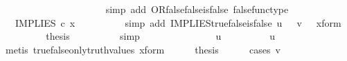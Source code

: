 \begin{isabellebody}
\ \ \ \ \ \ \isamarkupfalse%
\ \isamarkupfalse%
\ {\isachardoublequoteopen}{\isachardot}{\kern0pt}{\isachardot}{\kern0pt}{\isachardot}{\kern0pt}\ {\isacharequal}{\kern0pt}\ {\isasymf}{\isachardoublequoteclose}\isanewline
\ \ \ \ \ \ \ \ \isamarkupfalse%
\ {\isacharparenleft}{\kern0pt}simp\ add{\isacharcolon}{\kern0pt}\ OR{\isacharunderscore}{\kern0pt}false{\isacharunderscore}{\kern0pt}false{\isacharunderscore}{\kern0pt}is{\isacharunderscore}{\kern0pt}false\ false{\isacharunderscore}{\kern0pt}func{\isacharunderscore}{\kern0pt}type{\isacharparenright}{\kern0pt}\isanewline
\ \ \ \ \ \ \isamarkupfalse%
\ \isamarkupfalse%
\ {\isachardoublequoteopen}{\isachardot}{\kern0pt}{\isachardot}{\kern0pt}{\isachardot}{\kern0pt}\ {\isacharequal}{\kern0pt}\ IMPLIES\ {\isasymcirc}\isactrlsub c\ x{\isachardoublequoteclose}\isanewline
\ \ \ \ \ \ \ \ \isamarkupfalse%
\ {\isacharparenleft}{\kern0pt}simp\ add{\isacharcolon}{\kern0pt}\ IMPLIES{\isacharunderscore}{\kern0pt}true{\isacharunderscore}{\kern0pt}false{\isacharunderscore}{\kern0pt}is{\isacharunderscore}{\kern0pt}false\ {\isacartoucheopen}u\ {\isacharequal}{\kern0pt}\ {\isasymt}{\isacartoucheclose}\ {\isacartoucheopen}v\ {\isacharequal}{\kern0pt}\ {\isasymf}{\isacartoucheclose}\ x{\isacharunderscore}{\kern0pt}form{\isacharparenright}{\kern0pt}\isanewline
\ \ \ \ \ \ \isamarkupfalse%
\ \isamarkupfalse%
\ {\isacharquery}{\kern0pt}thesis\isanewline
\ \ \ \ \ \ \ \ \isamarkupfalse%
\ simp\isanewline
\ \ \ \ \ \ \isamarkupfalse%
\isanewline
\ \ \isamarkupfalse%
\isanewline
\ \ \ \ \isamarkupfalse%
\ {\isachardoublequoteopen}u\ {\isasymnoteq}\ {\isasymt}{\isachardoublequoteclose}\isanewline
\ \ \ \ \isamarkupfalse%
\ \isamarkupfalse%
\ {\isachardoublequoteopen}u\ {\isacharequal}{\kern0pt}\ {\isasymf}{\isachardoublequoteclose}\isanewline
\ \ \ \ \ \ \ \ \isamarkupfalse%
\ {\isacharparenleft}{\kern0pt}metis\ true{\isacharunderscore}{\kern0pt}false{\isacharunderscore}{\kern0pt}only{\isacharunderscore}{\kern0pt}truth{\isacharunderscore}{\kern0pt}values\ x{\isacharunderscore}{\kern0pt}form{\isacharparenright}{\kern0pt}\isanewline
\ \ \ \ \isamarkupfalse%
\ {\isacharquery}{\kern0pt}thesis\ \isanewline
\ \ \ \ \isamarkupfalse%
{\isacharparenleft}{\kern0pt}cases\ {\isachardoublequoteopen}v\ {\isacharequal}{\kern0pt}\ {\isasymt}{\isachardoublequoteclose}{\isacharparenright}{\kern0pt}\isanewline

\end{isabellebody}
